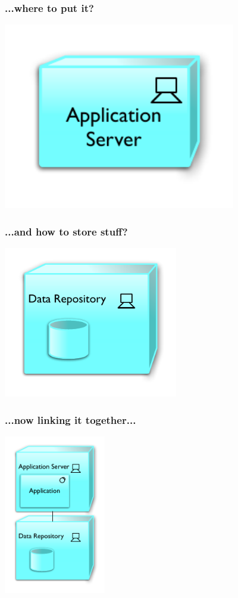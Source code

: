 \documentclass[t,handout]{beamer}
\begin{document}
\begin{frame}
\frametitle{...where to put it?}
\includegraphics[width = 4in]{cap-app-srv.pdf}
\transfade
\end{frame}

\begin{frame}
\frametitle{...and how to store stuff?}
\begin{center}
\includegraphics[width = 3in]{cap-data-repo.pdf}
\end{center}
\transfade
\end{frame}

\begin{frame}
\frametitle{...now linking it together...}
\begin{center}
\includegraphics[width = 1.75in]{cap-stack.pdf}
\end{center}
\transfade
\end{frame}
\end{document}
